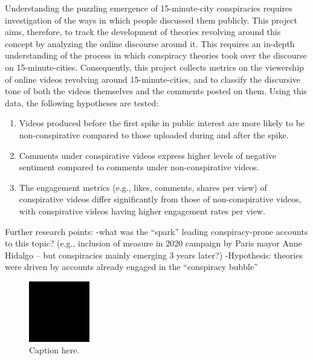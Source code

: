 \documentclass[fontsize=11pt, parskip=half]{scrartcl}
\begin{document}
    Understanding the puzzling emergence of 15-minute-city conspiracies requires investigation of the ways in which people discussed them publicly. This project aims, therefore, to track the development of theories revolving around this concept by analyzing the online discourse around it. This requires an in-depth understanding of the process in which conspiracy theories took over the discourse on 15-minute-cities. Consequently, this project collects metrics on the viewership of online videos revolving around 15-minute-cities, and to classify the discursive tone of both the videos themselves and the comments posted on them. Using this data, the following hypotheses are tested: 
    \begin{enumerate}
        \item Videos produced before the first spike in public interest are more likely to be non-conspirative compared to those uploaded during and after the spike.
        \item Comments under conspirative videos express higher levels of negative sentiment compared to comments under non-conspirative videos.
        \item The engagement metrics (e.g., likes, comments, shares per view) of conspirative videos differ significantly from those of non-conspirative videos, with conspirative videos having higher engagement rates per view.
    \end{enumerate}


Further research points: 
-what was the “spark” leading conspiracy-prone accounts to this topic? (e.g., inclusion of measure in 2020 campaign by Paris mayor Anne Hidalgo – but conspiracies mainly emerging 3 years later?)
-Hypothesis: theories were driven by accounts already engaged in the “conspiracy bubble”

    
    \begin{figure}
        \setlength\intextsep{0pt}
        \vspace{-30pt}
        \caption{} %
        \includegraphics[width=0.38 \textwidth]{img/ex.png}
        \vspace{-5pt}
        \caption*{Caption here.}
        \vspace{-20pt}
        \label{fig:attitude-distribution}
    \end{figure}
    
\end{document}
